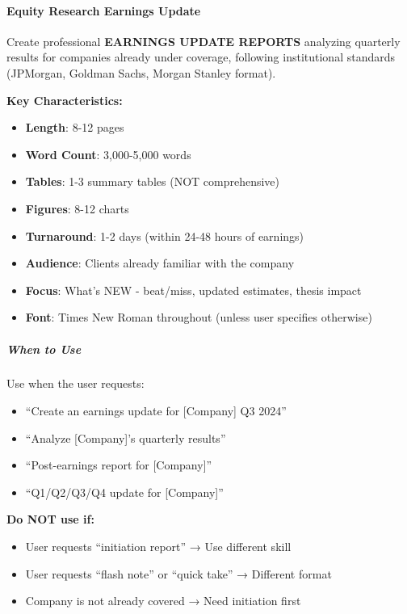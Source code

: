 \documentclass[11pt]{article}
\begin{document}
\paragraph{Equity Research Earnings Update}\mbox{}\par

Create professional \textbf{EARNINGS UPDATE REPORTS} analyzing quarterly results for companies already under coverage, following institutional standards (JPMorgan, Goldman Sachs, Morgan Stanley format).


\textbf{Key Characteristics:}

\begin{itemize}[leftmargin=*,itemsep=2pt,topsep=2pt]
\item {} \textbf{Length}: 8-12 pages
\item {} \textbf{Word Count}: 3,000-5,000 words
\item {} \textbf{Tables}: 1-3 summary tables (NOT comprehensive)
\item {} \textbf{Figures}: 8-12 charts
\item {} \textbf{Turnaround}: 1-2 days (within 24-48 hours of earnings)
\item {} \textbf{Audience}: Clients already familiar with the company
\item {} \textbf{Focus}: What's NEW - beat/miss, updated estimates, thesis impact
\item {} \textbf{Font}: Times New Roman throughout (unless user specifies otherwise)
\end{itemize}

\subparagraph{When to Use}\mbox{}\par

Use when the user requests:

\begin{itemize}[leftmargin=*,itemsep=2pt,topsep=2pt]
\item {} ``Create an earnings update for [Company] Q3 2024''
\item {} ``Analyze [Company]'s quarterly results''
\item {} ``Post-earnings report for [Company]''
\item {} ``Q1/Q2/Q3/Q4 update for [Company]''
\end{itemize}

\textbf{Do NOT use if:}

\begin{itemize}[leftmargin=*,itemsep=2pt,topsep=2pt]
\item {} User requests ``initiation report'' → Use different skill
\item {} User requests ``flash note'' or ``quick take'' → Different format
\item {} Company is not already covered → Need initiation first
\end{itemize}
\end{document}
